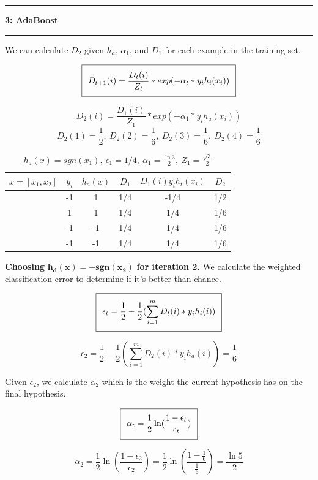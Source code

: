 \documentclass[11pt]{article}
\newcommand\question[2]{\vspace{.25in}\hrule\textbf{#1: #2}\vspace{.5em}\hrule\vspace{.10in}}
\begin{document}
\question{3}{AdaBoost}
We can calculate $D_2$ given $h_a$, $\alpha_1$, and $D_1$ for each example in the training set.

\begin{equation}
\setlength\fboxsep{0.25cm}
\setlength\fboxrule{0.4pt}
\boxed{D_{t+1}(i) = \frac{D_t(i)}{Z_t} * exp(-\alpha_t * y_ih_i(x_i))}
\end{equation}

$$D_{2}(i) = \frac{D_1(i)}{Z_1} * exp(-\alpha_1 * y_ih_a(x_i))$$
$$D_2(1) = \frac{1}{2}, \ D_2(2) = \frac{1}{6}, \ D_2(3) = \frac{1}{6}, \ D_2(4) = \frac{1}{6} $$


 \begin{table}[H]
\centering
{\renewcommand{\arraystretch}{1.2}%
\begin{tabular}{| c | c | c | c | c | c |}
\hline
$x = [x_1, x_2]$& $y_i$ & $h_a(x)$ & $D_1$ & $D_1(i)y_ih_t(x_i)$ & $D_2$\\
\hline
[1,1] & -1 & 1 & 1/4 & -1/4 & 1/2\\ \hline
[1,-1] & 1 & 1 & 1/4 & 1/4 & 1/6\\ \hline
[-1,-1] & -1 & -1 & 1/4 & 1/4 & 1/6\\ \hline
[-1,1] & -1 & -1 & 1/4 & 1/4 & 1/6\\ \hline
\end{tabular}}
\caption{$h_a(x) = sgn(x_1), \ \epsilon_1 = 1/4, \ \alpha_1 = \frac{\ln3}{2}, \ Z_1 = \frac{\sqrt{3}}{2}$}
\end{table}

\textbf{Choosing} $\mathbf{h_d(x) = -sgn(x_2)}$ \textbf{for iteration 2.} We calculate the weighted classification error to determine if it's better than chance.

\begin{equation}
\setlength\fboxsep{0.25cm}
\setlength\fboxrule{0.4pt}
\boxed{\epsilon_t = \frac{1}{2} - \frac{1}{2}(\sum_{i=1}^m D_t(i)*y_ih_i(i))}
\end{equation}

$$\epsilon_2 = \frac{1}{2} - \frac{1}{2}(\sum_{i=1}^m D_2(i)*y_ih_d(i)) = \frac{1}{6}$$

Given $\epsilon_2$, we calculate $\alpha_2$ which is the weight the current hypothesis has on the final hypothesis.

\begin{equation}
\setlength\fboxsep{0.25cm}
\setlength\fboxrule{0.4pt}
\boxed{\alpha_t = \frac{1}{2}\ln(\frac{1 - \epsilon_t}{\epsilon_t})}
\end{equation}

$$\alpha_2 = \frac{1}{2}\ln(\frac{1 - \epsilon_2}{\epsilon_2}) = \frac{1}{2}\ln(\frac{1 - \frac{1}{6}}{\frac{1}{6}}) = \frac{\ln5}{2}$$
\end{document}
